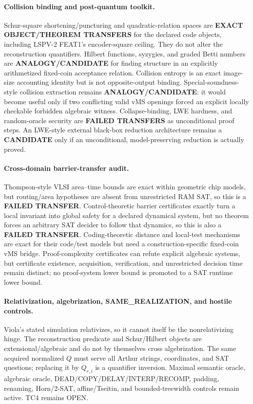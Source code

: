 \documentclass[11pt]{article}
\begin{document}
\paragraph{Collision binding and post-quantum toolkit.}
Schur-square shortening/puncturing and quadratic-relation spaces are \textbf{EXACT OBJECT/THEOREM TRANSFERS} for the declared code objects, including LSPV-2 FEAT1's encoder-square ceiling. They do not alter the reconstruction quantifiers. Hilbert functions, syzygies, and graded Betti numbers are \textbf{ANALOGY/CANDIDATE} for finding structure in an explicitly arithmetized fixed-coin acceptance relation. Collision entropy is an exact image-size accounting identity but is not opposite-output binding. Special-soundness-style collision extraction remains \textbf{ANALOGY/CANDIDATE}: it would become useful only if two conflicting valid vMS openings forced an explicit locally checkable forbidden algebraic witness. Collapse-binding, LWE hardness, and random-oracle security are \textbf{FAILED TRANSFERS} as unconditional proof steps. An LWE-style external black-box reduction architecture remains a \textbf{CANDIDATE} only if an unconditional, model-preserving reduction is actually proved.

\paragraph{Cross-domain barrier-transfer audit.}
Thompson-style VLSI area--time bounds are exact within geometric chip models, but routing/area hypotheses are absent from unrestricted RAM SAT, so this is a \textbf{FAILED TRANSFER}. Control-theoretic barrier certificates exactly turn a local invariant into global safety for a declared dynamical system, but no theorem forces an arbitrary SAT decider to follow that dynamics, so this is also a \textbf{FAILED TRANSFER}. Coding-theoretic distance and local-test mechanisms are exact for their code/test models but need a construction-specific fixed-coin vMS bridge. Proof-complexity certificates can refute explicit algebraic systems, but certificate existence, acquisition, verification, and unrestricted decision time remain distinct; no proof-system lower bound is promoted to a SAT runtime lower bound.

\paragraph{Relativization, algebrization, SAME\_REALIZATION, and hostile controls.}
Viola's stated simulation relativizes, so it cannot itself be the nonrelativizing hinge. The reconstruction predicate and Schur/Hilbert objects are extensional/algebraic and do not by themselves cross algebrization. The same acquired normalized $Q$ must serve all Arthur strings, coordinates, and SAT questions; replacing it by $Q_{r,i}$ is a quantifier inversion. Maximal semantic oracle, algebraic oracle, DEAD/COPY/DELAY/INTERP/RECOMP, padding, renaming, Horn/2-SAT, affine/Tseitin, and bounded-treewidth controls remain active. TC4 remains OPEN.
\end{document}
